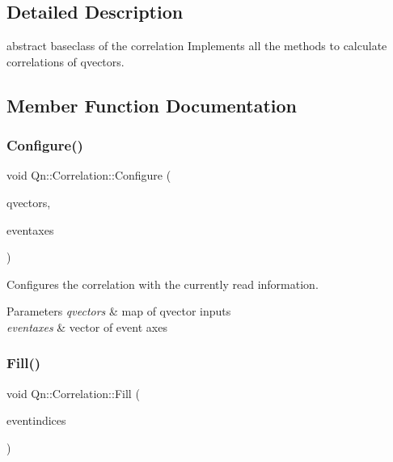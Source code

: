 \subsection{Detailed Description}
abstract baseclass of the correlation Implements all the methods to calculate correlations of qvectors. 

\subsection{Member Function Documentation}
\mbox{\label{classQn_1_1Correlation_af1c6d506b693424d56d0a796d4b50873}} 
\subsubsection{\texorpdfstring{Configure()}{Configure()}}
{\footnotesize\ttfamily void Qn\+::\+Correlation\+::\+Configure (\begin{DoxyParamCaption}\item[{std\+::map$<$ std\+::string, \mbox{\hyperlink{classQn_1_1DataContainer}{Qn\+::\+Data\+Container\+Q\+Vector}} $\ast$$>$ $\ast$}]{qvectors,  }\item[{const std\+::vector$<$ \mbox{\hyperlink{classQn_1_1Axis}{Qn\+::\+Axis}} $>$ \&}]{eventaxes }\end{DoxyParamCaption})}

Configures the correlation with the currently read information. 
\begin{DoxyParams}{Parameters}
{\em qvectors} & map of qvector inputs \\
\hline
{\em eventaxes} & vector of event axes \\
\hline
\end{DoxyParams}
\mbox{\label{classQn_1_1Correlation_afc02d9cca889ff4ee3af7fa75131c6dd}} 
\subsubsection{\texorpdfstring{Fill()}{Fill()}}
{\footnotesize\ttfamily void Qn\+::\+Correlation\+::\+Fill (\begin{DoxyParamCaption}\item[{const std\+::vector$<$ unsigned long $>$ \&}]{eventindices }\end{DoxyParamCaption})}

